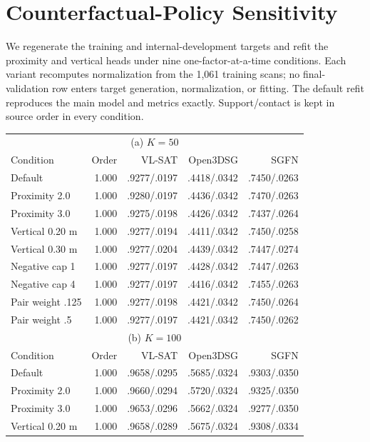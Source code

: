 \section{Counterfactual-Policy Sensitivity}

We regenerate the training and internal-development targets and refit the
proximity and vertical heads under nine one-factor-at-a-time conditions. Each
variant recomputes normalization from the 1,061 training scans; no final-
validation row enters target generation, normalization, or fitting. The
default refit reproduces the main model and metrics exactly. Support/contact is
kept in source order in every condition.

\begin{table}[t]
\centering
{\small
\setlength{\tabcolsep}{2.4pt}
\begin{tabular}{lrrrr}
\toprule
\multicolumn{5}{c}{(a) $K=50$} \\
Condition & Order & VL-SAT & Open3DSG & SGFN \\
\midrule
Default & 1.000 & .9277/.0197 & .4418/.0342 & .7450/.0263 \\
Proximity 2.0 & 1.000 & .9280/.0197 & .4436/.0342 & .7470/.0263 \\
Proximity 3.0 & 1.000 & .9275/.0198 & .4426/.0342 & .7437/.0264 \\
Vertical 0.20 m & 1.000 & .9277/.0194 & .4411/.0342 & .7450/.0258 \\
Vertical 0.30 m & 1.000 & .9277/.0204 & .4439/.0342 & .7447/.0274 \\
Negative cap 1 & 1.000 & .9277/.0197 & .4428/.0342 & .7447/.0263 \\
Negative cap 4 & 1.000 & .9277/.0197 & .4416/.0342 & .7455/.0263 \\
Pair weight .125 & 1.000 & .9277/.0198 & .4421/.0342 & .7450/.0264 \\
Pair weight .5 & 1.000 & .9277/.0197 & .4421/.0342 & .7450/.0262 \\
\midrule
\multicolumn{5}{c}{(b) $K=100$} \\
Condition & Order & VL-SAT & Open3DSG & SGFN \\
\midrule
Default & 1.000 & .9658/.0295 & .5685/.0324 & .9303/.0350 \\
Proximity 2.0 & 1.000 & .9660/.0294 & .5720/.0324 & .9325/.0350 \\
Proximity 3.0 & 1.000 & .9653/.0296 & .5662/.0324 & .9277/.0350 \\
Vertical 0.20 m & 1.000 & .9658/.0289 & .5675/.0324 & .9308/.0334 \\

\end{tabular}}
\end{table}
